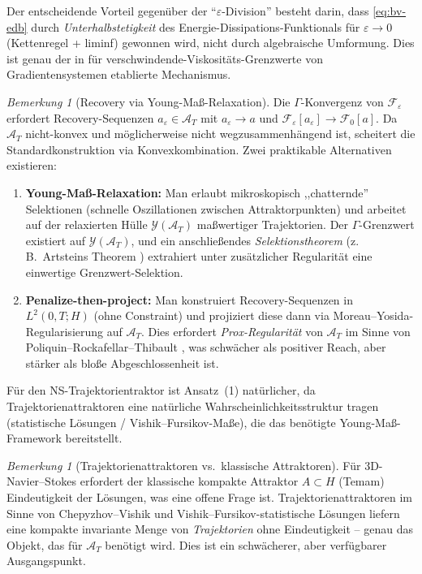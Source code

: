 \documentclass[12pt,a4paper]{article}
\theoremstyle{definition}
\theoremstyle{plain}
\theoremstyle{remark}
\newtheorem{remark}[definition]{Bemerkung}
\begin{document}
Der entscheidende Vorteil gegen\"uber der ``$\varepsilon$-Division'' besteht darin, dass \eqref{eq:bv-edb} durch \emph{Unterhalbstetigkeit} des Energie-Dissipations-Funktionals f\"ur $\varepsilon \to 0$ (Kettenregel + liminf) gewonnen wird, nicht durch algebraische Umformung. Dies ist genau der in \cite{MielkeRossiSavare2016} f\"ur verschwindende-Viskosit\"ats-Grenzwerte von Gradientensystemen etablierte Mechanismus.

\begin{remark}[Recovery via Young-Ma{\ss}-Relaxation]\label{rem:young-measure}
Die $\Gamma$-Konvergenz von $\mathcal{F}_\varepsilon$ erfordert Recovery-Sequenzen $a_\varepsilon \in \mathcal{A}_T$ mit $a_\varepsilon \to a$ und $\mathcal{F}_\varepsilon[a_\varepsilon] \to \mathcal{F}_0[a]$. Da $\mathcal{A}_T$ nicht-konvex und m\"oglicherweise nicht wegzusammenh\"angend ist, scheitert die Standardkonstruktion via Konvexkombination. Zwei praktikable Alternativen existieren:
\begin{enumerate}
\item \textbf{Young-Ma{\ss}-Relaxation:} Man erlaubt mikroskopisch ,,chatternde'' Selektionen (schnelle Oszillationen zwischen Attraktorpunkten) und arbeitet auf der relaxierten H\"ulle $\mathcal{Y}(\mathcal{A}_T)$ ma{\ss}wertiger Trajektorien. Der $\Gamma$-Grenzwert existiert auf $\mathcal{Y}(\mathcal{A}_T)$, und ein anschlie{\ss}endes \emph{Selektionstheorem} (z.\,B.\ Artsteins Theorem \cite{Artstein1995}) extrahiert unter zus\"atzlicher Regularit\"at eine einwertige Grenzwert-Selektion.
\item \textbf{Penalize-then-project:} Man konstruiert Recovery-Sequenzen in $L^2(0,T;H)$ (ohne Constraint) und projiziert diese dann via Moreau--Yosida-Regularisierung auf $\mathcal{A}_T$. Dies erfordert \emph{Prox-Regularit\"at} von $\mathcal{A}_T$ im Sinne von Poliquin--Rockafellar--Thibault \cite{PoliquinRockafellarThibault2000}, was schw\"acher als positiver Reach, aber st\"arker als blo{\ss}e Abgeschlossenheit ist.
\end{enumerate}
F\"ur den NS-Trajektorientraktor ist Ansatz~(1) nat\"urlicher, da Trajektorienattraktoren eine nat\"urliche Wahrscheinlichkeitsstruktur tragen (statistische L\"osungen / Vishik--Fursikov-Ma{\ss}e), die das ben\"otigte Young-Ma{\ss}-Framework bereitstellt.
\end{remark}

\begin{remark}[Trajektorienattraktoren vs.\ klassische Attraktoren]\label{rem:trajectory-attractor}
F\"ur 3D-Navier--Stokes erfordert der klassische kompakte Attraktor $A \subset H$ (Temam) Eindeutigkeit der L\"osungen, was eine offene Frage ist. Trajektorienattraktoren im Sinne von Chepyzhov--Vishik \cite{ChepyzhovVishik2002} und Vishik--Fursikov-statistische L\"osungen liefern eine kompakte invariante Menge von \emph{Trajektorien} ohne Eindeutigkeit -- genau das Objekt, das f\"ur $\mathcal{A}_T$ ben\"otigt wird. Dies ist ein schw\"acherer, aber verf\"ugbarer Ausgangspunkt.
\end{remark}
\end{document}
